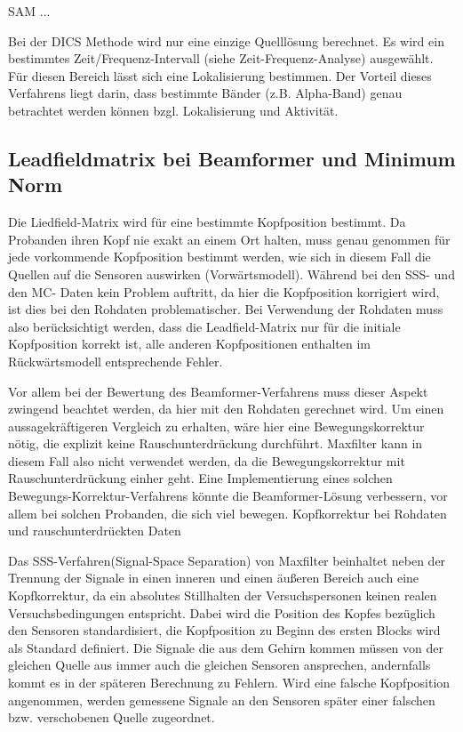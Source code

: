 \documentclass[doc,a4paper,12pt]{apa6}
\begin{document}
SAM ...

Bei der DICS Methode wird nur eine einzige Quelllösung berechnet. Es wird ein bestimmtes Zeit/Frequenz-Intervall (siehe Zeit-Frequenz-Analyse) ausgewählt. Für diesen Bereich lässt sich eine Lokalisierung bestimmen. Der Vorteil dieses Verfahrens liegt darin, dass bestimmte Bänder (z.B. Alpha-Band) genau betrachtet werden können bzgl. Lokalisierung und Aktivität.

\subsection{Leadfieldmatrix bei Beamformer und Minimum Norm}

Die Liedfield-Matrix wird für eine bestimmte Kopfposition bestimmt. Da Probanden ihren Kopf nie exakt an einem Ort halten, muss genau genommen für jede vorkommende Kopfposition bestimmt werden, wie sich in diesem Fall die Quellen auf die Sensoren auswirken (Vorwärtsmodell). Während bei den SSS- und den MC- Daten kein Problem auftritt, da hier die Kopfposition korrigiert wird, ist dies bei den Rohdaten problematischer. Bei Verwendung der Rohdaten muss also berücksichtigt werden, dass die Leadfield-Matrix nur für die initiale Kopfposition korrekt ist, alle anderen Kopfpositionen enthalten im Rückwärtsmodell entsprechende Fehler.

Vor allem bei der Bewertung des Beamformer-Verfahrens muss dieser Aspekt zwingend beachtet werden, da hier mit den Rohdaten gerechnet wird. Um einen aussagekräftigeren Vergleich zu erhalten, wäre hier eine Bewegungskorrektur nötig, die explizit keine Rauschunterdrückung durchführt. Maxfilter kann in diesem Fall also nicht verwendet werden, da die Bewegungskorrektur mit Rauschunterdrückung einher geht. Eine Implementierung eines solchen Bewegungs-Korrektur-Verfahrens könnte die Beamformer-Lösung verbessern, vor allem bei solchen Probanden, die sich viel bewegen.
Kopfkorrektur bei Rohdaten und rauschunterdrückten Daten

Das SSS-Verfahren(Signal-Space Separation) von Maxfilter beinhaltet neben der Trennung der Signale in einen inneren und einen äußeren Bereich auch eine Kopfkorrektur, da ein absolutes Stillhalten der Versuchspersonen keinen realen Versuchsbedingungen entspricht. Dabei wird die Position des Kopfes bezüglich den Sensoren standardisiert, die Kopfposition zu Beginn des ersten Blocks wird als Standard definiert. Die Signale die aus dem Gehirn kommen müssen von der gleichen Quelle aus immer auch die gleichen Sensoren ansprechen, andernfalls kommt es in der späteren Berechnung zu Fehlern. Wird eine falsche Kopfposition angenommen, werden gemessene Signale an den Sensoren später einer falschen bzw. verschobenen Quelle zugeordnet.
\end{document}
